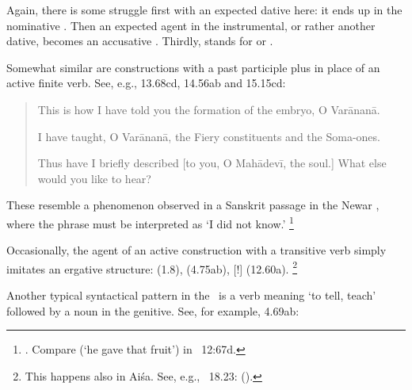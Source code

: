 \noindent
Again, there is some struggle first with an expected dative here:
it ends up in the nominative . Then an expected 
agent in the instrumental, or rather another dative, 
becomes an accusative . Thirdly,
 stands for  or
. 

Somewhat similar are constructions with a 
past participle plus 
in place of an active finite verb. See, e.g.,
13.68cd, 14.56ab and 15.15cd:

\begin{quote}

            This is how I have told you the formation of 
            the embryo, O Varānanā.
            

			I have taught, O Varānanā, the Fiery constituents 
			and the Soma-ones.
			

		Thus have I briefly described [to you, O Mahādevī, the soul.] 
		What else would you like to hear?
\end{quote}

\noindent
These resemble a phenomenon \citeauthor{JorgensenVicitra}
observed in a Sanskrit passage in the Newar
\VicitraKAU, where the phrase \label{najnatoham} must be interpreted
as `I did not know.'%
		\footnote{.\label{najnatohamfn}
						Compare  (`he gave that fruit') in \VSS\ 12:67d.}


Occasionally, the agent of an active construction with a transitive verb
simply imitates an ergative structure:  (1.8),
 (4.75ab),
[!]  (12.60a).%
		\footnote{This happens also in Aiśa. See, e.g., \SiddhYogMata\ 18.23: 
		 ().}

\label{tellplusgen}Another typical syntactical pattern in the \VSS\ is a verb
meaning `to tell, teach' followed by a noun in the genitive. See, for example, 4.69ab:

